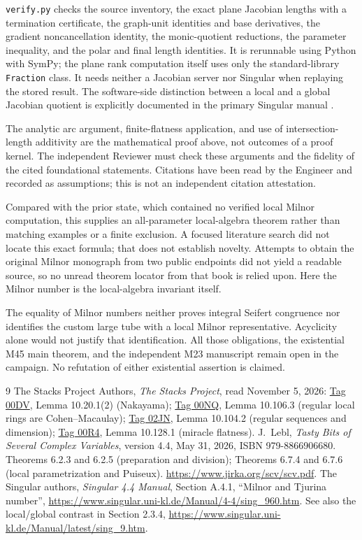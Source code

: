 \documentclass[11pt]{article}
\begin{document}
\texttt{verify.py} checks the source inventory, the exact plane
Jacobian lengths with a termination certificate, the graph-unit
identities and base derivatives, the gradient noncancellation
identity, the monic-quotient reductions, the parameter inequality,
and the polar and final length identities.  It is rerunnable using
Python with SymPy; the plane rank computation itself uses only the
standard-library \texttt{Fraction} class.  It needs neither a
Jacobian server nor Singular when replaying the stored result.
The software-side distinction between a local and a global
Jacobian quotient is explicitly documented in the primary
Singular manual \cite[Section A.4.1]{singular}.

The analytic arc argument, finite-flatness application, and use of
intersection-length additivity are the mathematical proof above,
not outcomes of a proof kernel.  The independent Reviewer must
check these arguments and the fidelity of the cited foundational
statements.  Citations have been read by the Engineer and recorded
as assumptions; this is not an independent citation attestation.

Compared with the prior state, which contained no verified local
Milnor computation, this supplies an all-parameter local-algebra
theorem rather than matching examples or a finite exclusion.
A focused literature search did not locate this exact formula;
that does not establish novelty.  Attempts to obtain the original
Milnor monograph from two public endpoints did not yield a readable
source, so no unread theorem locator from that book is relied upon.
Here the Milnor number is the local-algebra invariant itself.

The equality of Milnor numbers neither proves integral Seifert
congruence nor identifies the custom large tube with a local Milnor
representative.  Acyclicity alone would not justify that
identification.  All those obligations, the existential M45 main
theorem, and the independent M23 manuscript remain open in the
campaign.  No refutation of either existential assertion is claimed.

\begin{thebibliography}{9}
The Stacks Project Authors, \emph{The Stacks Project}, read November
5, 2026:
\href{https://stacks.math.columbia.edu/tag/00DV}{Tag 00DV},
Lemma 10.20.1(2) (Nakayama);
\href{https://stacks.math.columbia.edu/tag/00NQ}{Tag 00NQ},
Lemma 10.106.3 (regular local rings are Cohen--Macaulay);
\href{https://stacks.math.columbia.edu/tag/02JN}{Tag 02JN},
Lemma 10.104.2 (regular sequences and dimension);
\href{https://stacks.math.columbia.edu/tag/00R4}{Tag 00R4},
Lemma 10.128.1 (miracle flatness).
J.~Lebl, \emph{Tasty Bits of Several Complex Variables},
version 4.4, May 31, 2026, ISBN 979-8866906680.
Theorems 6.2.3 and 6.2.5 (preparation and division);
Theorems 6.7.4 and 6.7.6 (local parametrization and Puiseux).
\url{https://www.jirka.org/scv/scv.pdf}.
The Singular authors, \emph{Singular 4.4 Manual},
Section A.4.1, ``Milnor and Tjurina number'',
\url{https://www.singular.uni-kl.de/Manual/4-4/sing_960.htm}.
See also the local/global contrast in Section 2.3.4,
\url{https://www.singular.uni-kl.de/Manual/latest/sing_9.htm}.
\end{thebibliography}
\end{document}
